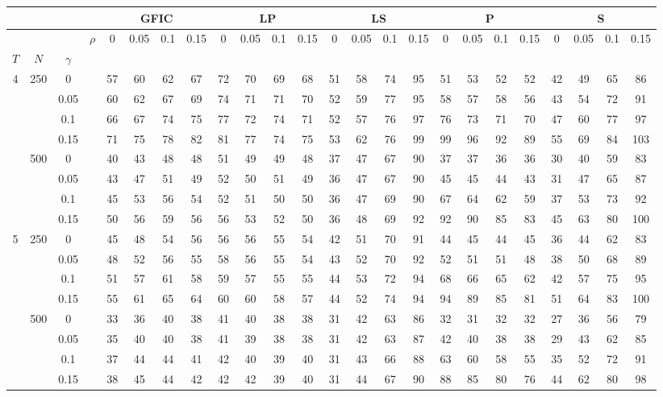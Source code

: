 \begin{tabular}{cccc|cccc|cccc|cccc|cccc|cccc} 
 \hline \hline 
\multicolumn{4}{c}{}&\multicolumn{4}{c}{GFIC}&\multicolumn{4}{c}{LP}&\multicolumn{4}{c}{LS}&\multicolumn{4}{c}{P}&\multicolumn{4}{c}{S}\\ 
 \hline
 &  &  & $\rho$ & 0 & 0.05 & 0.1 & 0.15 & 0 & 0.05 & 0.1 & 0.15 & 0 & 0.05 & 0.1 & 0.15 & 0 & 0.05 & 0.1 & 0.15 & 0 & 0.05 & 0.1 & 0.15 \\
$T$ & $N$ & $\gamma$ &  &  &  &  &  &  &  &  &  &  &  &  &  &  &  &  &  &  &  &  &  \\
\hline
4 & 250 & 0 &  & 57 & 60 & 62 & 67 & 72 & 70 & 69 & 68 & 51 & 58 & 74 & 95 & 51 & 53 & 52 & 52 & 42 & 49 & 65 & 86 \\
 &  & 0.05 &  & 60 & 62 & 67 & 69 & 74 & 71 & 71 & 70 & 52 & 59 & 77 & 95 & 58 & 57 & 58 & 56 & 43 & 54 & 72 & 91 \\
 &  & 0.1 &  & 66 & 67 & 74 & 75 & 77 & 72 & 74 & 71 & 52 & 57 & 76 & 97 & 76 & 73 & 71 & 70 & 47 & 60 & 77 & 97 \\
 &  & 0.15 &  & 71 & 75 & 78 & 82 & 81 & 77 & 74 & 75 & 53 & 62 & 76 & 99 & 99 & 96 & 92 & 89 & 55 & 69 & 84 & 103 \\
 \hline
 & 500 & 0 &  & 40 & 43 & 48 & 48 & 51 & 49 & 49 & 48 & 37 & 47 & 67 & 90 & 37 & 37 & 36 & 36 & 30 & 40 & 59 & 83 \\
 &  & 0.05 &  & 43 & 47 & 51 & 49 & 52 & 50 & 51 & 49 & 36 & 47 & 67 & 90 & 45 & 45 & 44 & 43 & 31 & 47 & 65 & 87 \\
 &  & 0.1 &  & 45 & 53 & 56 & 54 & 52 & 51 & 50 & 50 & 36 & 47 & 69 & 90 & 67 & 64 & 62 & 59 & 37 & 53 & 73 & 92 \\
 &  & 0.15 &  & 50 & 56 & 59 & 56 & 56 & 53 & 52 & 50 & 36 & 48 & 69 & 92 & 92 & 90 & 85 & 83 & 45 & 63 & 80 & 100 \\
 \hline
5 & 250 & 0 &  & 45 & 48 & 54 & 56 & 56 & 56 & 55 & 54 & 42 & 51 & 70 & 91 & 44 & 45 & 44 & 45 & 36 & 44 & 62 & 83 \\
 &  & 0.05 &  & 48 & 52 & 56 & 55 & 58 & 56 & 55 & 54 & 43 & 52 & 70 & 92 & 52 & 51 & 51 & 48 & 38 & 50 & 68 & 89 \\
 &  & 0.1 &  & 51 & 57 & 61 & 58 & 59 & 57 & 55 & 55 & 44 & 53 & 72 & 94 & 68 & 66 & 65 & 62 & 42 & 57 & 75 & 95 \\
 &  & 0.15 &  & 55 & 61 & 65 & 64 & 60 & 60 & 58 & 57 & 44 & 52 & 74 & 94 & 94 & 89 & 85 & 81 & 51 & 64 & 83 & 100 \\
 \hline
 & 500 & 0 &  & 33 & 36 & 40 & 38 & 41 & 40 & 38 & 38 & 31 & 42 & 63 & 86 & 32 & 31 & 32 & 32 & 27 & 36 & 56 & 79 \\
 &  & 0.05 &  & 35 & 40 & 40 & 38 & 41 & 39 & 38 & 38 & 31 & 42 & 63 & 87 & 42 & 40 & 38 & 38 & 29 & 43 & 62 & 85 \\
 &  & 0.1 &  & 37 & 44 & 44 & 41 & 42 & 40 & 39 & 40 & 31 & 43 & 66 & 88 & 63 & 60 & 58 & 55 & 35 & 52 & 72 & 91 \\
 &  & 0.15 &  & 38 & 45 & 44 & 42 & 42 & 42 & 39 & 40 & 31 & 44 & 67 & 90 & 88 & 85 & 80 & 76 & 44 & 62 & 80 & 98 \\
\hline
\end{tabular}
